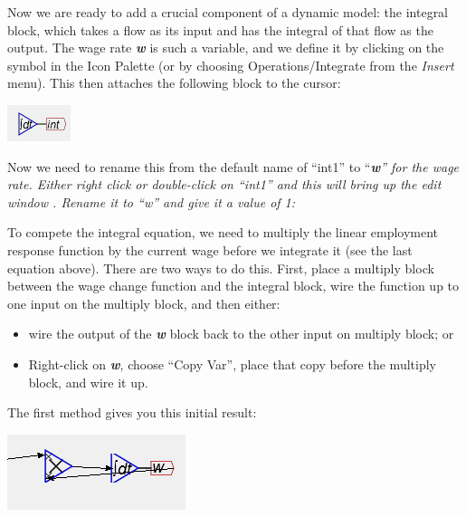Now we are ready to add a crucial component of a dynamic model: the
integral block, which takes a flow as its input and has the integral
of that flow as the output. The wage rate \textbf{\em w} is such
a variable, and we define it by clicking on the 
symbol in the Icon Palette (or by choosing Operations/Integrate from
the {\em Insert} menu). This then attaches the following block
to the cursor:
\begin{center}
\includegraphics{images/NewItem39} 
\par\end{center}

Now we need to rename this from the default name of ``int1'' to
``{\em\textbf{w}'' for the wage rate. Either right click or double-click
on ``int1'' and this will bring up the edit window . Rename it to
``w'' and give it a value of 1:}
\begin{center}
\par\end{center}

To compete the integral equation, we need to multiply the linear employment
response function by the current wage before we integrate it (see
the last equation above). There are two ways to do this. First, place
a multiply block between the wage change function and the integral
block, wire the function up to one input on the multiply block, and
then either:
\begin{itemize}
\item wire the output of the \textbf{\em w} block back to the other input
on multiply block; or 
\item Right-click on \textbf{\em w}, choose ``Copy Var'', place that
copy before the multiply block, and wire it up. 
\end{itemize}
The first method gives you this initial result:
\begin{center}
\includegraphics{images/NewItem110} 
\par\end{center}

